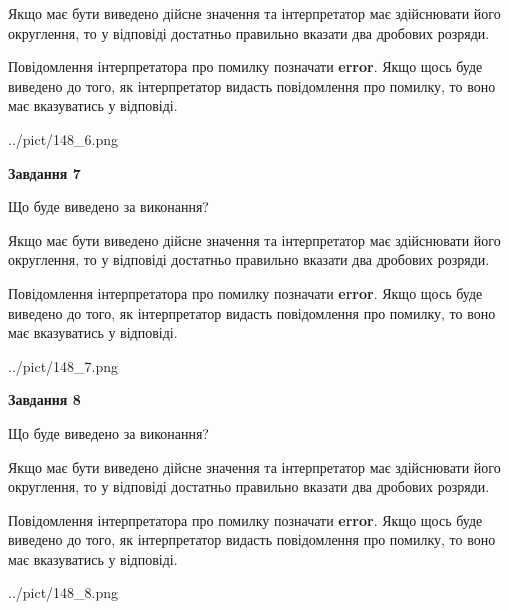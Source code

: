 \documentclass[12pt, ukrainian]{article}
\begin{document}
{\begin {Large}
Якщо має бути виведено дійсне значення та інтерпретатор має здійснювати його округлення, 
то у відповіді достатньо правильно вказати два дробових розряди.

Повідомлення інтерпретатора про помилку позначати \textbf{error}.
Якщо щось буде виведено до того, як інтерпретатор видасть повідомлення про помилку, 
то воно має вказуватись у відповіді. \par

\begin{center}
	{../pict/148_6.png}
\end{center}
\newpage

{\begin {center}\textbf{Завдання 7}\end {center}}\par
Що буде виведено за виконання? \par

Якщо має бути виведено дійсне значення та інтерпретатор має здійснювати його округлення, 
то у відповіді достатньо правильно вказати два дробових розряди.

Повідомлення інтерпретатора про помилку позначати \textbf{error}.
Якщо щось буде виведено до того, як інтерпретатор видасть повідомлення про помилку, 
то воно має вказуватись у відповіді. \par

\begin{center}
	{../pict/148_7.png}
\end{center}
\newpage

{\begin {center}\textbf{Завдання 8}\end {center}}\par
Що буде виведено за виконання? \par

Якщо має бути виведено дійсне значення та інтерпретатор має здійснювати його округлення, 
то у відповіді достатньо правильно вказати два дробових розряди.

Повідомлення інтерпретатора про помилку позначати \textbf{error}.
Якщо щось буде виведено до того, як інтерпретатор видасть повідомлення про помилку, 
то воно має вказуватись у відповіді. \par

\begin{center}
	{../pict/148_8.png}
\end{center}
\newpage


\end{Large}}
\end{document}
